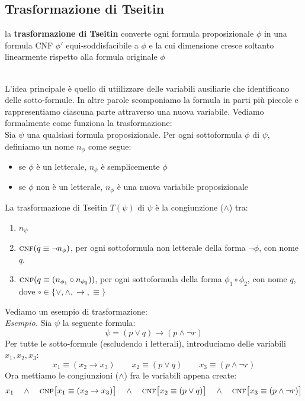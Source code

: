 \subsection{Trasformazione di Tseitin}
\colorbox{SALZO}{\parbox{\dimexpr\linewidth-2\fboxsep}{\begin{theorem}
   la \textbf{trasformazione di Tseitin} converte ogni formula proposizionale $\phi$ in una 
   formula CNF $\phi'$ equi-soddisfacibile a $\phi$ e la cui dimensione cresce soltanto linearmente rispetto alla 
   formula originale $\phi$
\end{theorem}}}\smallskip\\
L'idea principale è quello di utiilizzare delle variabili ausiliarie che identificano delle sotto-formule.
In altre parole scomponiamo la formula in parti più piccole e rappresentiamo ciascuna parte attraverso una nuova variabile.
Vediamo formalmente come funziona la trasformazione:\\
Sia $\psi$ una qualsiasi formula proposizionale. Per ogni sottoformula $\phi$ di $\psi$, definiamo un nome $n_{\phi}$ come segue:
\begin{itemize}
    \item se $\phi$ è un letterale, $n_{\phi}$ è semplicemente $\phi$
    \item se $\phi$ non è un letterale, $n_{\phi}$ è una nuova variabile proposizionale 
\end{itemize}
La trasformazione di Tseitin $T(\psi)$ di $\psi$ è la congiunzione ($\wedge$) tra:
\begin{enumerate}
    \item $n_{\psi}$
    \item \(\textsc{cnf}(q\equiv\neg n_\phi)\), per ogni sottoformula non letterale della forma \(\neg\phi\), con nome \(q\).
    \item \(\textsc{cnf}(q\equiv(n_{\phi_1}\circ n_{\phi_2}))\), per ogni sottoformula della forma \(\phi_1\circ\phi_2\), con nome \(q\), dove $\circ \in \{ \vee, \wedge, \to, \equiv  \}$
\end{enumerate}
Vediamo un esempio di trasformazione:\\
\textit{Esempio.} Sia $\psi$ la seguente formula:
\[   \psi  = (p \vee q) \to (p \wedge \neg r )    \]
Per tutte le sotto-formule (escludendo i letterali), introduciamo delle variabili $x_1,x_2,x_3$:
\[    x_1 \equiv (x_2 \to x_3) \qquad x_2 \equiv (p \vee q) \qquad x_3 \equiv (p \wedge \neg r )    \]
Ora mettiamo le congiunzioni ($\wedge$) fra le variabili appena create:
\[  x_1 \quad \wedge \quad \textsc{cnf}\big[  x_1 \equiv (x_2 \to x_3)  \big] \quad \wedge \quad  \textsc{cnf}\big[  x_2 \equiv (p \vee q) \big]  \quad \wedge \quad 
    \textsc{cnf}\big[  x_3 \equiv (p \wedge \neg r ) \big]    \]
